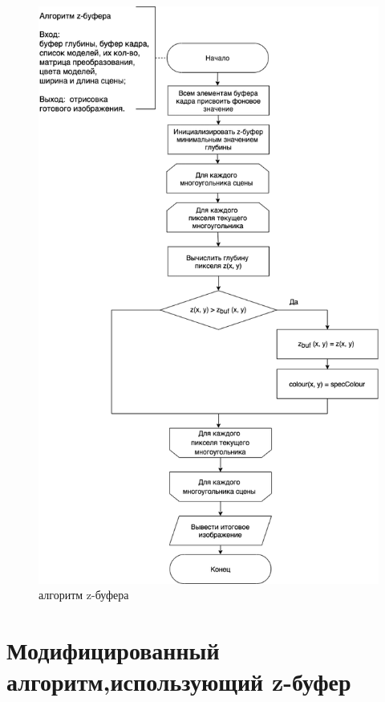 \documentclass[a4paper,14pt, unknownkeysallowed]{extreport}
\begin{document}
\begin{figure}[h]
	\centering
	\includegraphics[scale=0.45]{img/scheme_3.png}
	\caption{алгоритм z-буфера}
	\label{fig:alg1}
\end{figure} 


\section[Модифицированный алгоритм, использующий z-буфер]{Модифицированный алгоритм,\linebreak использующий z-буфер}
\end{document}
